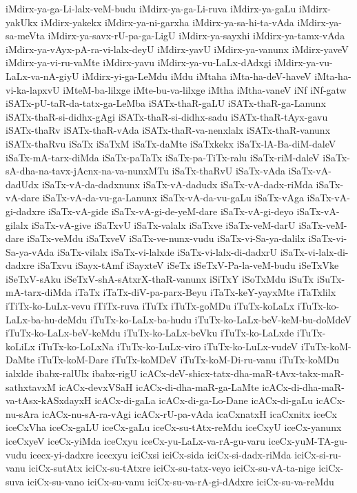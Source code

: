 {iMdirx-ya-ga-Li-lalx-veM-budu
iMdirx-ya-ga-Li-ruva
iMdirx-ya-gaLu
iMdirx-yakUkx
iMdirx-yakekx
iMdirx-ya-ni-garxha
iMdirx-ya-sa-hi-ta-vAda
iMdirx-ya-sa-meVta
iMdirx-ya-savx-rU-pa-ga-LigU
iMdirx-ya-sayxhi
iMdirx-ya-tamx-vAda
iMdirx-ya-vAyx-pA-ra-vi-lalx-deyU
iMdirx-yavU
iMdirx-ya-vanunx
iMdirx-yaveV
iMdirx-ya-vi-ru-vaMte
iMdirx-yavu
iMdirx-ya-vu-LaLx-dAdxgi
iMdirx-ya-vu-LaLx-va-nA-giyU
iMdirx-yi-ga-LeMdu
iMdu
iMtaha
iMta-ha-deV-haveV
iMta-ha-vi-ka-lapxvU
iMteM-ba-lilxge
iMte-bu-va-lilxge
iMtha
iMtha-vaneV
iNf
iNf-gatw
iSATx-pU-taR-da-tatx-ga-LeMba
iSATx-thaR-gaLU
iSATx-thaR-ga-Lanunx
iSATx-thaR-si-didhx-gAgi
iSATx-thaR-si-didhx-sadu
iSATx-thaR-tAyx-gavu
iSATx-thaRv
iSATx-thaR-vAda
iSATx-thaR-va-nenxlalx
iSATx-thaR-vanunx
iSATx-thaRvu
iSaTx
iSaTxM
iSaTx-daMte
iSaTxkekx
iSaTx-lA-Ba-diM-daleV
iSaTx-mA-tarx-diMda
iSaTx-paTaTx
iSaTx-pa-TiTx-ralu
iSaTx-riM-daleV
iSaTx-sA-dha-na-tavx-jAcnx-na-va-nunxMTu
iSaTx-thaRvU
iSaTx-vAda
iSaTx-vA-dadUdx
iSaTx-vA-da-dadxnunx
iSaTx-vA-dadudx
iSaTx-vA-dadx-riMda
iSaTx-vA-dare
iSaTx-vA-da-vu-ga-Lanunx
iSaTx-vA-da-vu-gaLu
iSaTx-vAga
iSaTx-vA-gi-dadxre
iSaTx-vA-gide
iSaTx-vA-gi-de-yeM-dare
iSaTx-vA-gi-deyo
iSaTx-vA-gilalx
iSaTx-vA-give
iSaTxvU
iSaTx-valalx
iSaTxve
iSaTx-veM-darU
iSaTx-veM-dare
iSaTx-veMdu
iSaTxveV
iSaTx-ve-nunx-vudu
iSaTx-vi-Sa-ya-dalilx
iSaTx-vi-Sa-ya-vAda
iSaTx-vilalx
iSaTx-vi-lalxde
iSaTx-vi-lalx-di-dadxrU
iSaTx-vi-lalx-di-dadxre
iSaTxvu
iSayx-tAmf
iSayxteV
iSeTx
iSeTxV-Pa-la-veM-budu
iSeTxVke
iSeTxV-sAku
iSeTxV-shA-sAtxrX-thaR-vanunx
iSiTxY
iSoTxMdu
iSuTx
iSuTx-mA-tarx-diMda
iTaTx
iTaTx-diV-pa-parx-Beyu
iTaTx-keY-yayxMte
iTaTxlilx
iTiTx-ko-LuLx-vevu
iTiTx-ruva
iTuTx
iTuTx-goMDu
iTuTx-koLaLx
iTuTx-ko-LaLx-ba-hu-deMdu
iTuTx-ko-LaLx-ba-hudu
iTuTx-ko-LaLx-beV-keM-bu-doMdeV
iTuTx-ko-LaLx-beV-keMdu
iTuTx-ko-LaLx-beVku
iTuTx-ko-LaLxde
iTuTx-koLiLx
iTuTx-ko-LoLxNa
iTuTx-ko-LuLx-viro
iTuTx-ko-LuLx-vudeV
iTuTx-koM-DaMte
iTuTx-koM-Dare
iTuTx-koMDeV
iTuTx-koM-Di-ru-vanu
iTuTx-koMDu
ialxlde
ibabx-ralUlx
ibabx-rigU
icACx-deV-shicx-tatx-dha-maR-tAvx-takx-maR-sathxtavxM
icACx-devxVSaH
icACx-di-dha-maR-ga-LaMte
icACx-di-dha-maR-va-tAsx-kASxdayxH
icACx-di-gaLa
icACx-di-ga-Lo-Dane
icACx-di-gaLu
icACx-nu-sAra
icACx-nu-sA-ra-vAgi
icACx-rU-pa-vAda
icaCxnatxH
icaCxnitx
iceCx
iceCxVha
iceCx-gaLU
iceCx-gaLu
iceCx-su-tAtx-reMdu
iceCxyU
iceCx-yanunx
iceCxyeV
iceCx-yiMda
iceCxyu
iceCx-yu-LaLx-va-rA-gu-varu
iceCx-yuM-TA-gu-vudu
icecx-yi-dadxre
icecxyu
iciCxsi
iciCx-sida
iciCx-si-dadx-riMda
iciCx-si-ru-vanu
iciCx-sutAtx
iciCx-su-tAtxre
iciCx-su-tatx-veyo
iciCx-su-vA-ta-nige
iciCx-suva
iciCx-su-vano
iciCx-su-vanu
iciCx-su-va-rA-gi-dAdxre
iciCx-su-va-reMdu
}
